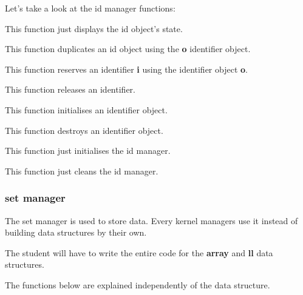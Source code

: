 Let's take a look at the id manager functions:


This function just displays the id object's state.


This function duplicates an id object using the \textbf{o} identifier
object.


This function reserves an identifier \textbf{i} using the identifier
object \textbf{o}.


This function releases an identifier.


This function initialises an identifier object.


This function destroys an identifier object.


This function just initialises the id manager.


This function just cleans the id manager.

%
%

\subsubsection{set manager}

The set manager is used to store data. Every kernel managers use it
instead of building data structures by their own.

The student will have to write the entire code for the \textbf{array} and
\textbf{ll} data structures.

The functions below are explained independently of the data structure.


